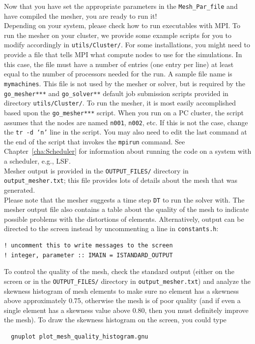 Now that you have set the appropriate parameters in the \texttt{Mesh\_Par\_file}
and have compiled the mesher, you are ready to run it!\\

Depending on your system, please check how to run executables with MPI.
To run the mesher on your cluster, we provide some example scripts for you to modify accordingly in \texttt{utils/Cluster/}.
For some installations, you might need to provide a file
that tells MPI what compute nodes to use for the simulations. In this case, the
file must have a number of entries (one entry per line) at least equal
to the number of processors needed for the run.
A sample file name is \texttt{mymachines}. This file is not used by the mesher
or solver, but is required by the \texttt{go\_mesher***} and \texttt{go\_solver**}
default job submission scripts provided in directory \texttt{utils/Cluster/}.
To run the mesher, it is most easily accomplished based upon the \texttt{go\_mesher***} script.
When you run on a PC cluster, the script assumes that the nodes are
named \texttt{n001}, \texttt{n002}, etc.
If this is not the case, change the \texttt{tr -d `n'} line in the script.
You may also need to edit the last command
at the end of the script that invokes the \texttt{mpirun} command.
See Chapter~\ref{cha:Scheduler}
for information about running the code on a system with a scheduler,
e.g., LSF.\\


Mesher output is provided in the \texttt{OUTPUT\_FILES/} directory
in \texttt{output\_mesher.txt}; this file provides lots of details
about the mesh that was generated.\\


Please note that the mesher suggests
a time step \texttt{DT} to run the solver with. The mesher output
file also contains a table about the quality of the mesh to indicate
possible problems with the distortions of elements. Alternatively,
output can be directed to the screen instead by uncommenting a line
in \texttt{constants.h}:
{\small
\begin{verbatim}
! uncomment this to write messages to the screen
! integer, parameter :: IMAIN = ISTANDARD_OUTPUT
\end{verbatim}}


To control the quality of the mesh, check the standard output (either
on the screen or in the \texttt{OUTPUT\_FILES/} directory in \texttt{output\_mesher.txt})
and analyze the skewness histogram of mesh elements to make sure no
element has a skewness above approximately 0.75, otherwise the mesh
is of poor quality (and if even a single element has a skewness value
above 0.80, then you must definitely improve the mesh). To draw the
skewness histogram on the screen, you could type
{\small \begin{verbatim}
  gnuplot plot_mesh_quality_histogram.gnu
\end{verbatim}}


